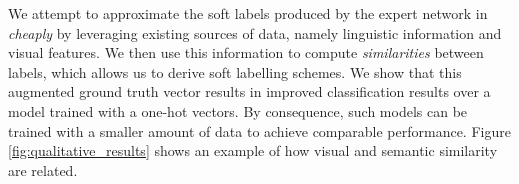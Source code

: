 We attempt to approximate the soft labels produced by the expert network in
\cite{hinton2015distilling} \emph{cheaply} by leveraging existing sources of
data, namely linguistic information and visual features. We then use this
information to compute \emph{similarities} between labels, which allows us to
derive soft labelling schemes. We show that this augmented ground truth vector
results in improved classification results over a model trained with a one-hot
vectors. By consequence, such models can be trained with a smaller amount of
data to achieve comparable performance. Figure \ref{fig:qualitative_results}
shows an example of how visual and semantic similarity are related.



